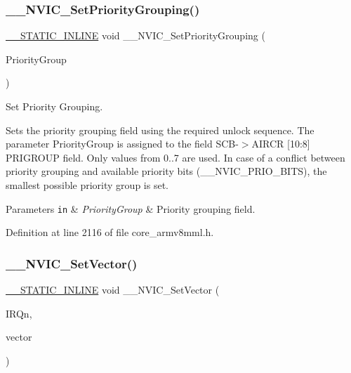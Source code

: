 \subsubsection{\texorpdfstring{\+\_\+\+\_\+\+N\+V\+I\+C\+\_\+\+Set\+Priority\+Grouping()}{\_\_NVIC\_SetPriorityGrouping()}}
{\footnotesize\ttfamily \hyperlink{cmsis__iccarm_8h_aba87361bfad2ae52cfe2f40c1a1dbf9c}{\+\_\+\+\_\+\+S\+T\+A\+T\+I\+C\+\_\+\+I\+N\+L\+I\+NE} void \+\_\+\+\_\+\+N\+V\+I\+C\+\_\+\+Set\+Priority\+Grouping (\begin{DoxyParamCaption}\item[{uint32\+\_\+t}]{Priority\+Group }\end{DoxyParamCaption})}



Set Priority Grouping. 

Sets the priority grouping field using the required unlock sequence. The parameter Priority\+Group is assigned to the field S\+C\+B-\/$>$A\+I\+R\+CR \mbox{[}10\+:8\mbox{]} P\+R\+I\+G\+R\+O\+UP field. Only values from 0..7 are used. In case of a conflict between priority grouping and available priority bits (\+\_\+\+\_\+\+N\+V\+I\+C\+\_\+\+P\+R\+I\+O\+\_\+\+B\+I\+TS), the smallest possible priority group is set. 
\begin{DoxyParams}[1]{Parameters}
\mbox{\tt in}  & {\em Priority\+Group} & Priority grouping field. \\
\hline
\end{DoxyParams}


Definition at line 2116 of file core\+\_\+armv8mml.\+h.

\mbox{\label{group___c_m_s_i_s___core___n_v_i_c_functions_ga0df355460bc1783d58f9d72ee4884208}} 
\subsubsection{\texorpdfstring{\+\_\+\+\_\+\+N\+V\+I\+C\+\_\+\+Set\+Vector()}{\_\_NVIC\_SetVector()}}
{\footnotesize\ttfamily \hyperlink{cmsis__iccarm_8h_aba87361bfad2ae52cfe2f40c1a1dbf9c}{\+\_\+\+\_\+\+S\+T\+A\+T\+I\+C\+\_\+\+I\+N\+L\+I\+NE} void \+\_\+\+\_\+\+N\+V\+I\+C\+\_\+\+Set\+Vector (\begin{DoxyParamCaption}\item[{\hyperlink{group___c_m_s_i_s__18_x_x___i_r_q_gaa44deabd252bda567898bae35a086adc}{I\+R\+Qn\+\_\+\+Type}}]{I\+R\+Qn,  }\item[{uint32\+\_\+t}]{vector }\end{DoxyParamCaption})}



